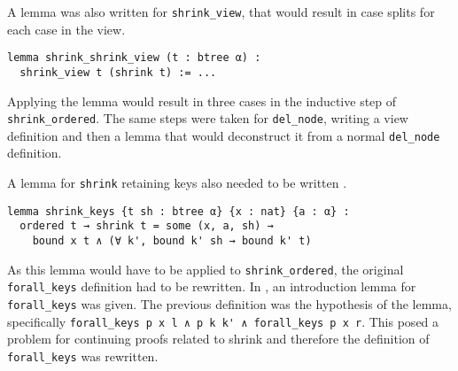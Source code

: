 A lemma was also written for \lstinline{shrink_view}, that would result in case splits for each case in the view. 

\begin{lstlisting}
lemma shrink_shrink_view (t : btree α) : 
  shrink_view t (shrink t) := ...
\end{lstlisting}

Applying the lemma would result in three cases in the inductive step of \lstinline{shrink_ordered}. The same steps were taken for \lstinline{del_node}, writing a view definition and then a lemma that would deconstruct it from a normal \lstinline{del_node} definition.

A lemma for \lstinline{shrink} retaining keys also needed to be written .

\begin{lstlisting}
lemma shrink_keys {t sh : btree α} {x : nat} {a : α} :
  ordered t → shrink t = some (x, a, sh) → 
    bound x t ∧ (∀ k', bound k' sh → bound k' t)
\end{lstlisting}

As this lemma would have to be applied to \lstinline{shrink_ordered}, the original \lstinline{forall_keys} definition had to be rewritten. In , an introduction lemma for \lstinline{forall_keys} was given. The previous definition was the hypothesis of the lemma, specifically \lstinline{forall_keys p x l ∧ p k k' ∧ forall_keys p x r}. This posed a problem for continuing proofs related to shrink  and therefore the definition of \lstinline{forall_keys} was rewritten.